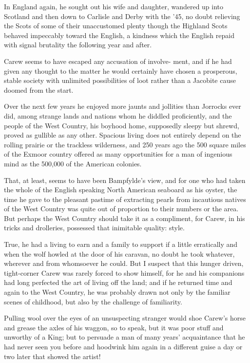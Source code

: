In England again, he sought out his wife and daughter, wandered up into Scotland and then down to Carlisle and Derby with the '45, no doubt relieving the Scots of some of their unaccustomed plenty   though the Highland Scots behaved impeccably toward the English, a kindness which the English repaid with signal brutality the following year and after.

Carew seems to have escaped any accusation of involve- ment, and if he had given any thought to the matter he would certainly have chosen a prosperous, stable society with unlimited possibilities of loot rather than a Jacobite cause doomed from the start.

Over the next few years he enjoyed more jaunts and jollities than  Jorrocks ever did, among strange lands and nations whom he diddled proficiently, and the people of the West Country, his boyhood home, supposedly sleepy but shrewd, proved as gullible as any other. Spacious living does not entirely depend on the rolling prairie or the trackless wilderness, and 250 years ago the 500 square miles of the Exmoor country offered as many opportunities for a man of ingenious mind as the 500,000 of the American colonies.

That, at least, seems to have been Bampfylde's view, and for one who had taken the whole of the English speaking North American seaboard as his oyster, the time he gave to the pleasant pastime of extracting pearls from incautious natives of the West Country was quite out of proportion to their numbers or the area. But perhaps the West Country should take it as a compliment, for Carew, in his tricks and drolleries, possessed that inimitable quality: style.

True, he had a living to earn and a family to support   if a little erratically   and when the wolf howled at the door of his caravan, no doubt he took whatever, wherever and from whomsoever he could. But I suspect that this hunger driven, tight-corner Carew was rarely forced to show himself, for he and his companions had long perfected the art of living off the land; and if he returned time and again to the West Country, he was probably drawn not only by the familiar scenes of childhood, but also by the challenge of familiarity.

Pulling wool over the eyes of an unsuspecting stranger would shoe Carew’s horse and grease the axles of his waggon, so to speak, but it was poor stuff and unworthy of a King; but to persuade a man of many years' acquaintance that he had never seen you before and hoodwink him again in a different guise a day or two later   that showed the artist!

